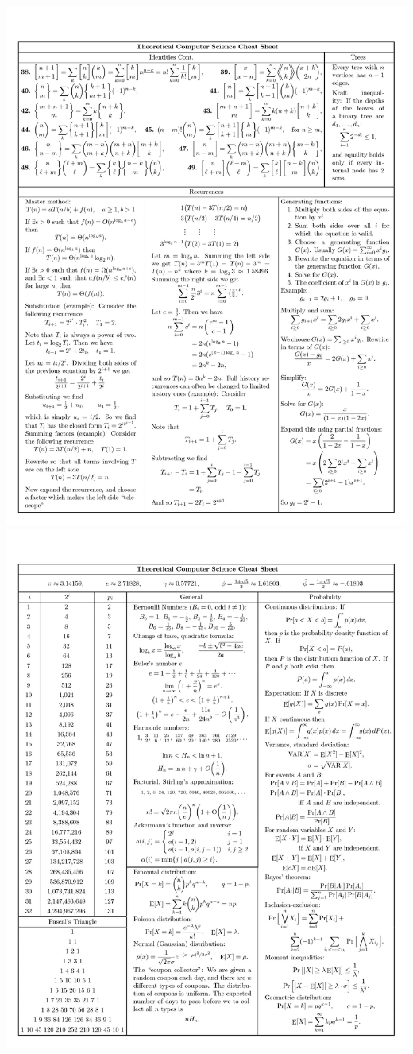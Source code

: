 \documentclass{article}
\begin{document}
\includegraphics[trim = 6mm 2mm 0mm 10mm,clip=true,scale = 0.73]{./images/image-0002.jpg}
\newpage
\includegraphics[trim = 6mm 2mm 0mm 10mm,clip=true,scale = 0.73]{./images/image-0003.jpg}
\end{document}
